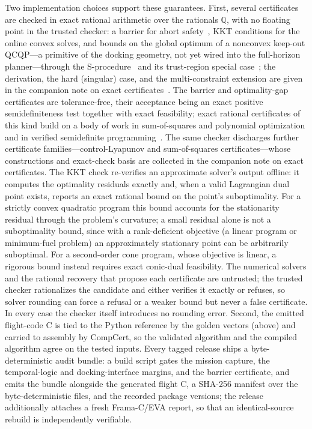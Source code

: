 \documentclass[11pt]{article}
\newcommand{\Q}{\mathbb{Q}}
\begin{document}
Two implementation choices support these guarantees. First, several certificates
are checked in exact rational arithmetic over the rationals $\Q$, with no floating
point in the trusted checker: a barrier for abort safety~\cite{prajna2004,ames2017}, KKT conditions
for the online convex solves, and bounds on the global optimum of a nonconvex
keep-out QCQP---a primitive of the docking geometry, not yet wired into the
full-horizon planner---through the S-procedure~\cite{yakubovich1971,polik2007}
and its trust-region special case~\cite{moresorensen1983}; the derivation, the
hard (singular) case, and the multi-constraint extension are given in the companion
note on exact certificates~\cite{oltean2026certnote}. The
barrier and optimality-gap certificates are tolerance-free, their acceptance
being an exact positive semidefiniteness test together with exact feasibility;
exact rational certificates of this kind build on a body of work in
sum-of-squares and polynomial optimization and in verified semidefinite
programming~\cite{parrilo2003,lasserre2001,kaltofen2012,peyrl2008,davis2022,lin2013exactsos}. The
same checker discharges further certificate families---control-Lyapunov and
sum-of-squares certificates---whose constructions and exact-check basis are
collected in the companion note on exact certificates.
The KKT check re-verifies an approximate solver's output offline: it computes the
optimality residuals exactly and, when a valid Lagrangian dual point exists,
reports an exact rational bound on the point's suboptimality. For a strictly
convex quadratic program this bound accounts for the stationarity residual
through the problem's curvature; a small residual alone is not a suboptimality
bound, since with a rank-deficient objective (a linear program or minimum-fuel problem) an
approximately stationary point can be arbitrarily suboptimal. For a second-order
cone program, whose objective is linear, a rigorous bound instead requires exact
conic-dual feasibility. The numerical solvers and the rational recovery that
propose each certificate are untrusted; the trusted checker rationalizes the
candidate and either verifies it exactly or refuses, so solver rounding can force
a refusal or a weaker bound but never a false certificate. In every case the
checker itself introduces no rounding error. Second, the emitted flight-code C is
tied to the Python reference by the golden
vectors (above) and carried to assembly by CompCert, so the validated algorithm
and the compiled algorithm agree on the tested inputs. Every tagged
release ships a byte-deterministic audit bundle: a build script gates the mission
capture, the temporal-logic and docking-interface margins, and the barrier
certificate, and emits the bundle alongside the generated flight C, a SHA-256
manifest over the byte-deterministic files, and the recorded package versions; the
release additionally attaches a fresh Frama-C/EVA report, so that an
identical-source rebuild is independently verifiable.
\end{document}
